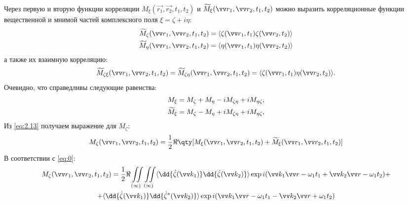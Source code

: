 Через первую и вторую функции корреляции $M_{\xi}(\vec{r_1},\vec{r_2},t_1,t_2)$
и $\tM_{\xi}(\vec{r_1},\vec{r_2},t_1,t_2)$ можно выразить корреляционные функции вещественной и мнимой частей комплексного поля $\xi= \zeta + i\eta$:
\begin{gather}
\label{eq:2}
	\tM_{\zeta}(\vec{r_1},\vec{r_2},t_1,t_2)= \mean{\zeta(\vec{r_1},t_1)\zeta(\vec{r_2},t_2) }\\
	\tM_{\eta}(\vec{r_1},\vec{r_2},t_1,t_2)= \mean{\eta(\vec{r_1},t_1)\eta(\vec{r_2},t_2) }
\end{gather}
а также их взаимную корреляцию:
\begin{equation}
	\tM_{\zeta \xi}(\vec{r_1},\vec{r_2},t_1,t_2)=\tM_{ \zeta\eta}(\vec{r_1},\vec{r_2},t_1,t_2)=
	\mean{\zeta(\vec r_1, t_1) \eta(\vec r_2, t_2)}.
\end{equation}
Очевидно, что справедливы следующие равенства:
\begin{gather}
	\label{eq:2.13}
	M_{\xi}=M_{\zeta}+ M_{\eta}- iM_{\zeta \eta} + iM_{ \eta \zeta}, \\
	\widetilde{M}_{\xi}=M_{\zeta}-M_{\eta}+ iM_{\zeta \eta} + iM_{ \eta \zeta},
\end{gather}
Из \eqref{eq:2.13} получаем выражение для $M_{\zeta}$:
\begin{equation}
	M_{\zeta}(\vec{r_1},\vec{r_2},t_1,t_2)=\frac12\Re\qty[M_{\xi}(\vec{r_1},\vec{r_2},t_1,t_2)+\tM_{\xi}(\vec{r_1},\vec{r_2},t_1,t_2)]
\end{equation}
В соответствии с \eqref{eq:0}:
\begin{gather*}
	M_{\zeta}(\vec{r_1},\vec{r_2},t_1,t_2)= \frac12 \Re 
	\iint\limits_{(\infty)}  \iint\limits_{(\infty)}
	\mean{\dd{\dot \zeta(\vec k_1)} \dd{\dot \zeta(\vec k_2)} } 
	\exp{i(\vec k_1 \vec r - \omega_1 t_1 + \vec k_2 \vec r - \omega_1 t_2)} +\\ 
	+\mean{\dd{\dot \zeta(\vec k_1)} \dd{\dot \zeta^*(\vec k_2)} } 
	\exp{i(\vec k_1 \vec r - \omega_1 t_1 - \vec k_2 \vec r + \omega_1 t_2)}
\end{gather*}


